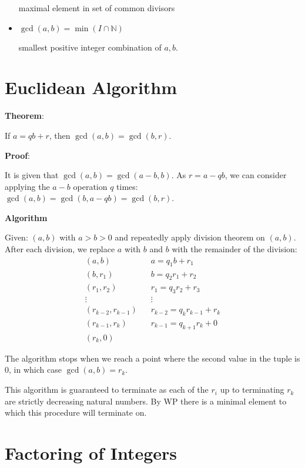 \documentclass{article}
\begin{document}
\begin{multicols*}{2}
\begin{itemize}
    maximal element in set of common divisors
    \item $\gcd(a, b) = \min(I \cap \mathbb{N})$

    smallest positive integer combination of $a, b$.

\end{itemize}

\section{Euclidean Algorithm}

\textbf{Theorem}:

If $a = qb + r$, then $\gcd(a, b) = \gcd(b, r)$.

\textbf{Proof}:

It is given that $\gcd(a, b) = \gcd(a - b, b)$. As $r = a - qb$, we can consider applying the $a - b$ operation $q$ times: $\gcd(a, b) = \gcd(b, a - qb) = \gcd(b, r)$.

\textbf{Algorithm}

Given: $(a, b)$ with $a > b > 0$ and repeatedly apply division theorem on $(a, b)$. After each division, we replace $a$ with $b$ and $b$ with the remainder of the division:\[\begin{aligned}
    (a, b) \;\;\;& a  = q_1b + r_1 \\
    (b, r_1) \;\;\;& b  = q_2r_1 + r_2 \\
    (r_1, r_2) \;\;\;& r_1  = q_3r_2 + r_3 \\
    \vdots \;\;\;& \vdots \\
    (r_{k-2},r_{k-1}) \;\;\;& r_{k-2} = q_kr_{k-1}+ r_k \\
    (r_{k-1}, r_k) \;\;\;& r_{k-1} = q_{k+1}r_{k}+ 0 \\
    (r_k, 0) \;\;\;&
\end{aligned}\]

The algorithm stops when we reach a point where the second value in the tuple is $0$, in which case $\gcd(a, b) = r_k$.

This algorithm is guaranteed to terminate as each of the $r_i$ up to terminating $r_k$ are strictly decreasing natural numbers. By WP there is a minimal element to which this procedure will terminate on.


\section{Factoring of Integers}


\end{multicols*}
\end{document}
